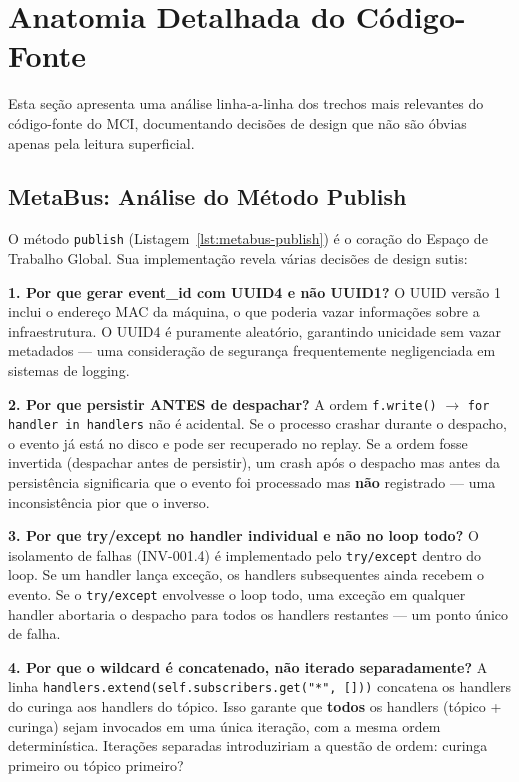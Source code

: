 

\section{Anatomia Detalhada do Código-Fonte}
\label{sec:code-anatomy}

Esta seção apresenta uma análise linha-a-linha dos trechos mais relevantes do código-fonte do MCI, documentando decisões de design que não são óbvias apenas pela leitura superficial.

\subsection{MetaBus: Análise do Método Publish}

O método \texttt{publish} (Listagem~\ref{lst:metabus-publish}) é o coração do Espaço de Trabalho Global. Sua implementação revela várias decisões de design sutis:

\textbf{1. Por que gerar event\_id com UUID4 e não UUID1?} O UUID versão 1 inclui o endereço MAC da máquina, o que poderia vazar informações sobre a infraestrutura. O UUID4 é puramente aleatório, garantindo unicidade sem vazar metadados — uma consideração de segurança frequentemente negligenciada em sistemas de logging.

\textbf{2. Por que persistir ANTES de despachar?} A ordem \texttt{f.write()} $\rightarrow$ \texttt{for handler in handlers} não é acidental. Se o processo crashar durante o despacho, o evento já está no disco e pode ser recuperado no replay. Se a ordem fosse invertida (despachar antes de persistir), um crash após o despacho mas antes da persistência significaria que o evento foi processado mas \textbf{não} registrado — uma inconsistência pior que o inverso.

\textbf{3. Por que try/except no handler individual e não no loop todo?} O isolamento de falhas (INV-001.4) é implementado pelo \texttt{try/except} dentro do loop. Se um handler lança exceção, os handlers subsequentes ainda recebem o evento. Se o \texttt{try/except} envolvesse o loop todo, uma exceção em qualquer handler abortaria o despacho para todos os handlers restantes — um ponto único de falha.

\textbf{4. Por que o wildcard é concatenado, não iterado separadamente?} A linha \texttt{handlers.extend(self.subscribers.get("*", []))} concatena os handlers do curinga aos handlers do tópico. Isso garante que \textbf{todos} os handlers (tópico + curinga) sejam invocados em uma única iteração, com a mesma ordem determinística. Iterações separadas introduziriam a questão de ordem: curinga primeiro ou tópico primeiro?

